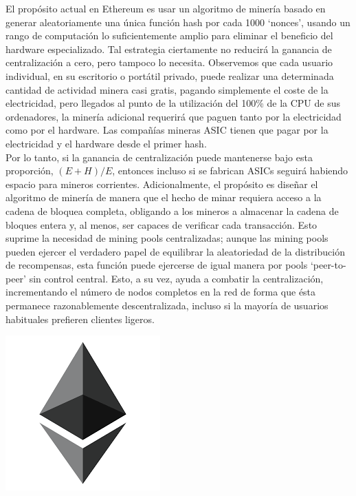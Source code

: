 \documentclass[11pt,a4paper]{article}
\begin{document}
El propósito actual en Ethereum es usar un algoritmo de minería basado en generar aleatoriamente una única función hash por cada 1000 ‘nonces’, usando un rango de computación lo suficientemente amplio para eliminar el beneficio del hardware especializado. Tal estrategia ciertamente no reducirá la ganancia de centralización a cero, pero tampoco lo necesita. Observemos que cada usuario individual, en su escritorio o portátil privado, puede realizar una determinada cantidad de actividad minera casi gratis, pagando simplemente el coste de la electricidad, pero llegados al punto de la utilización del 100\% de la CPU de sus ordenadores, la minería adicional requerirá que paguen tanto por la electricidad como por el hardware. Las compañías mineras ASIC tienen que pagar por la electricidad y el hardware desde el primer hash.\\

Por lo tanto, si la ganancia de centralización puede mantenerse bajo esta proporción, $(E+H)/E$, entonces incluso si se fabrican ASICs seguirá habiendo espacio para mineros corrientes. Adicionalmente, el propósito es diseñar el algoritmo de minería de manera que el hecho de minar requiera acceso a la cadena de bloquea completa, obligando a los mineros a almacenar la cadena de bloques entera y, al menos, ser capaces de verificar cada transacción. Esto suprime la necesidad de mining pools centralizadas; aunque las mining pools pueden ejercer el verdadero papel de equilibrar la aleatoriedad de la distribución de recompensas, esta función puede ejercerse de igual manera por pools ‘peer-to-peer’ sin control central. Esto, a su vez, ayuda a combatir la centralización, incrementando el número de nodos completos en la red de forma que ésta permanece razonablemente descentralizada, incluso si la mayoría de usuarios habituales prefieren clientes ligeros.\\


\newpage
\begin{center}
  \includegraphics[scale=.42]{images/logo.png}
\end{center}

\tableofcontents
\end{document}
